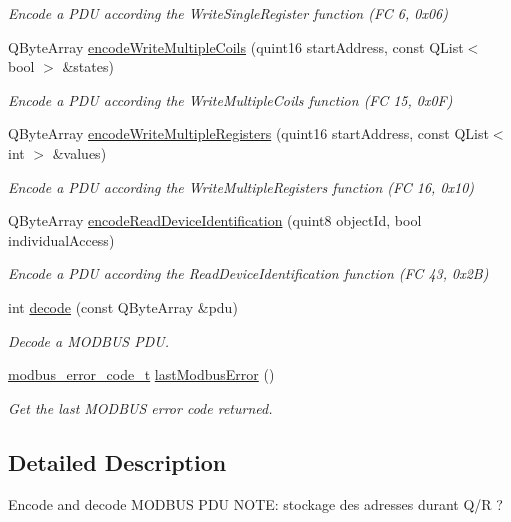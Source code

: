 \begin{DoxyCompactItemize}
\begin{DoxyCompactList}\small\item\em Encode a PDU according the WriteSingleRegister function (FC 6, 0x06) \end{DoxyCompactList}\item 
QByteArray \hyperlink{classmdt_frame_codec_modbus_a12013e4433f96b2658b464698135e9fa}{encodeWriteMultipleCoils} (quint16 startAddress, const QList$<$ bool $>$ \&states)
\begin{DoxyCompactList}\small\item\em Encode a PDU according the WriteMultipleCoils function (FC 15, 0x0F) \end{DoxyCompactList}\item 
QByteArray \hyperlink{classmdt_frame_codec_modbus_a04092bf1d376c4c630b2311cbc5dd126}{encodeWriteMultipleRegisters} (quint16 startAddress, const QList$<$ int $>$ \&values)
\begin{DoxyCompactList}\small\item\em Encode a PDU according the WriteMultipleRegisters function (FC 16, 0x10) \end{DoxyCompactList}\item 
QByteArray \hyperlink{classmdt_frame_codec_modbus_a54ac76dc91ee6f885aa1536fb9f8531c}{encodeReadDeviceIdentification} (quint8 objectId, bool individualAccess)
\begin{DoxyCompactList}\small\item\em Encode a PDU according the ReadDeviceIdentification function (FC 43, 0x2B) \end{DoxyCompactList}\item 
int \hyperlink{classmdt_frame_codec_modbus_a426f465363a49d70890a462b40677787}{decode} (const QByteArray \&pdu)
\begin{DoxyCompactList}\small\item\em Decode a MODBUS PDU. \end{DoxyCompactList}\item 
\hyperlink{classmdt_frame_codec_modbus_a31d8291be7f8636d5d295ce3066d7ac7}{modbus\_\-error\_\-code\_\-t} \hyperlink{classmdt_frame_codec_modbus_a21f3102e12f1a1d9c4145c1ce1f8e6b6}{lastModbusError} ()
\begin{DoxyCompactList}\small\item\em Get the last MODBUS error code returned. \end{DoxyCompactList}\end{DoxyCompactItemize}


\subsection{Detailed Description}
Encode and decode MODBUS PDU NOTE: stockage des adresses durant Q/R ? 

